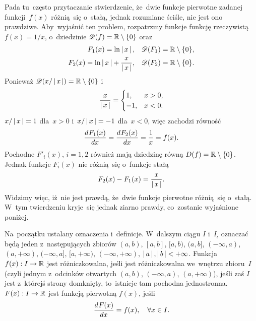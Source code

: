 \documentclass[a4paper,11pt]{article}
\begin{document}
\start {} Pada tu~często przytaczanie stwierdzenie, że~dwie
funkcje pierwotne zadanej funkcji~$f( x )$ różnią~się o~stałą, jednak
rozumiane ściśle, nie jest ono prawdziwe. Aby~wyjaśnić ten problem,
rozpatrzmy funkcje funkcję rzeczywistą $f( x ) = 1 / x$, o~dziedzinie
$\mathcal{D}( f ) = \mathbb{R} \setminus \{  0  \}$ oraz
\begin{subequations}
  \begin{align}
    \label{eq:FichtenholzVolII-01a}
    F_{ 1 }( x )
    = \ln\left| \,  x  \, \right|, \quad &\mathcal{D}( F_{ 1 } ) = \mathbb{R} \setminus \{  0  \}, \\
    \label{eq:FichtenholzVolII-01b}
    F_{ 2 }( x )
    = \ln\left| \,  x  \, \right| + \frac{ x }{ \left| \,  x  \, \right| },
    \quad &\mathcal{D}( F_{ 2 } ) = \mathbb{R} \setminus \{  0  \}.
  \end{align}
\end{subequations}
Ponieważ $\mathcal{D}( x / \left| \,  x  \, \right| ) = \mathbb{R} \setminus \{  0  \}$ i
\begin{equation}
  \label{eq:FichtenholzVolII-02}
  \frac{ x }{ \left| \,  x  \, \right| }
  =
  \begin{cases}
     1,   & x > 0, \\
    -1,   & x < 0.
  \end{cases}
\end{equation}
$x / \left| \,  x  \, \right| = 1$ dla~$x > 0$ i~$x / \left| \,  x  \, \right| = -1$ dla~$x < 0$,
więc zachodzi równość
\begin{equation}
  \label{eq:FichtenholzVolII-03}
  \frac{ d^{   } {  F_{ 1 }( x )  } }{ d {  x  }^{   } } = \frac{ d^{   } {  F_{ 2 }( x )  } }{ d {  x  }^{   } }
  = \frac{ 1 }{ x } = f( x ).
\end{equation}
Pochodne $F'_{ i }( x )$, $i = 1, 2$ również mają dziedzinę równą
$D( f ) = \mathbb{R} \setminus \{  0  \}$. Jednak funkcje $F_{ i }( x )$ nie
różnią~się o~funkcje stałą
\begin{equation}
  \label{eq:FichtenholzVolII-04}
  F_{ 2 }( x ) - F_{ 1 }( x ) = \frac{ x }{ \left| \,  x  \, \right| }.
\end{equation}
Widzimy więc, iż~nie jest prawdą, że~dwie funkcje pierwotne różnią~się
o~stałą. W~tym twierdzeniu kryje~się jednak ziarno prawdy, co~zostanie
wyjaśnione poniżej.

Na~początku ustalany oznaczenia i~definicje. W~dalszym ciągu $I$
i~$I_{ \iota }$ oznaczać będą jeden z~następujących zbiorów
$( a, b )$, $[ a, b ]$, $[ a, b )$, $( a, b ]$, $( -\infty, a )$,
$( a, +\infty )$, $( -\infty, a ]$, $[ a, +\infty )$,
$( -\infty, +\infty )$, $\left| \,  a  \, \right|, \left| \,  b  \, \right| < +\infty$. Funkcja
$f( x ): I \to \mathbb{R}$ jest różniczkowalna, jeśli jest różniczkowalna
we~wnętrzu zbioru~$I$ (czyli jednym z~odcinków otwartych $( a, b )$,
$( -\infty, a )$, $( a, +\infty )$), jeśli zaś $I$ jest z~którejś
strony domknięty, to~istnieje tam pochodna jednostronna.
$F( x ): I \to \mathbb{R}$ jest funkcją pierwotną $f( x )$, jeśli
\begin{equation}
  \label{eq:FichtenholzVolII-05}
  \frac{ d^{   } {  F( x )  } }{ d {  x  }^{   } } = f( x ), \quad \forall x \in I.
\end{equation}
\end{document}
